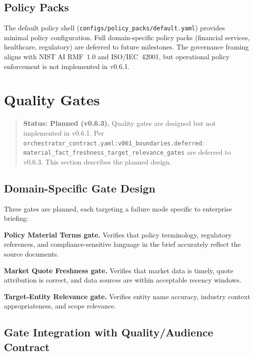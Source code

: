 \documentclass[11pt,a4paper]{article}
\begin{document}
\subsection{Policy Packs}

The default policy shell (\texttt{configs/policy\_packs/default.yaml}) provides minimal policy configuration. Full domain-specific policy packs (financial services, healthcare, regulatory) are deferred to future milestones. The governance framing aligns with NIST AI RMF~1.0 and ISO/IEC~42001, but operational policy enforcement is not implemented in v0.6.1.

\section{Quality Gates}
\label{sec:gates}

\begin{quote}
\textbf{Status: Planned (v0.6.3).} Quality gates are designed but not implemented in v0.6.1. Per \texttt{orchestrator\_contract.yaml:v061\_boundaries.deferred}: \texttt{material\_fact\_freshness\_target\_relevance\_gates} are deferred to v0.6.3. This section describes the planned design.
\end{quote}

\subsection{Domain-Specific Gate Design}

Three gates are planned, each targeting a failure mode specific to enterprise briefing:

\textbf{Policy Material Terms gate.} Verifies that policy terminology, regulatory references, and compliance-sensitive language in the brief accurately reflect the source documents.

\textbf{Market Quote Freshness gate.} Verifies that market data is timely, quote attribution is correct, and data sources are within acceptable recency windows.

\textbf{Target-Entity Relevance gate.} Verifies entity name accuracy, industry context appropriateness, and scope relevance.

\subsection{Gate Integration with Quality/Audience Contract}
\end{document}
